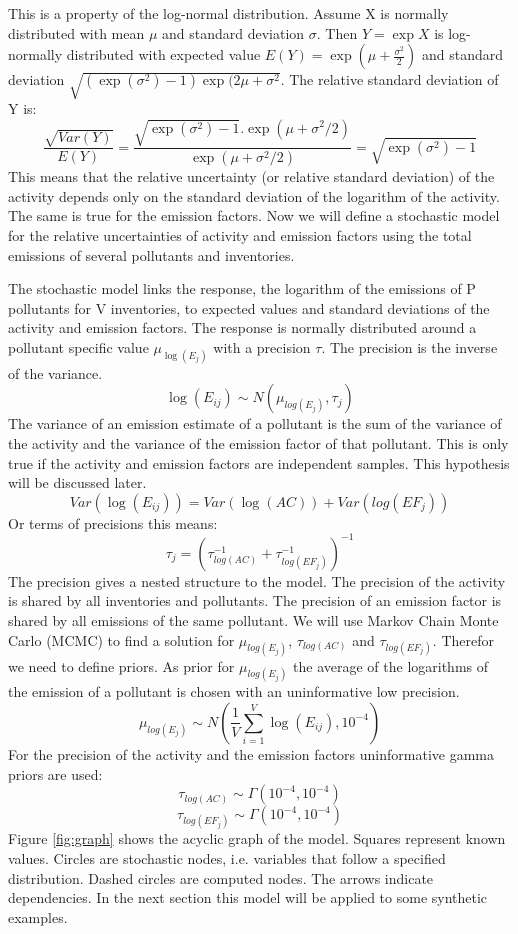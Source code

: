 \documentclass{article}
\begin{document}
This is a property of the log-normal distribution. Assume X is normally distributed with mean \(\mu\) and standard deviation \(\sigma\). Then \(Y=\exp{X}\) is log-normally distributed with expected value \(E(Y)=\exp(\mu+\frac{\sigma^2}{2})\) and standard deviation \(\sqrt{(\exp(\sigma^2)-1)\exp(2\mu+\sigma^2}\). The relative standard deviation of Y is:
\[\frac{\sqrt{Var(Y)}}{E(Y)} = \frac{\sqrt{\exp(\sigma^2)-1}.\exp(\mu+\sigma^2/2)}{\exp(\mu+\sigma^2/2)} = \sqrt{\exp(\sigma^2)-1}\]
This means that the relative uncertainty (or relative standard deviation) of the activity depends only on the standard deviation of the logarithm of the activity. The same is true for the emission factors. Now we will define a stochastic model for the relative uncertainties of activity and emission factors using the total emissions of several pollutants and inventories.

The stochastic model links the response, the logarithm of the emissions of P pollutants for V inventories, to expected values and standard deviations of the activity and emission factors. The response is normally distributed around a pollutant specific value \(\mu_{\log(E_{j})}\) with a precision \(\tau\). The precision is the inverse of the variance.
\[\log(E_{ij}) \sim N(\mu_{log(E_{j})},\tau_{j})\]
The variance of an emission estimate of a pollutant is the sum of the variance of the activity and the variance of the emission factor of that pollutant. This is only true if the activity and emission factors are independent samples. This hypothesis will be discussed later.
\[Var(\log(E_{ij})) = Var(\log(AC)) + Var(log(EF_{j}))\]
Or terms of precisions this means:
\[\tau_{j} = \left(\tau_{log(AC)}^{-1} + \tau_{log(EF_{j})}^{-1}\right)^{-1}\]
The precision gives a nested structure to the model. The precision of the activity is shared by all inventories and pollutants. The precision of an emission factor is shared by all emissions of the same pollutant.
We will use Markov Chain Monte Carlo (MCMC) to find a solution for \(\mu_{log(E_{j})}\), \(\tau_{log(AC)}\) and \(\tau_{log(EF_{j})}\). Therefor we need to define priors. As prior for \(\mu_{log(E_{j})}\) the average of the logarithms of the emission of a pollutant is chosen with an uninformative low precision.
\[\mu_{log(E_{j})} \sim N\left(\frac{1}{V}\sum_{i=1}^{V} \log(E_{ij}),10^{-4}\right) \]
For the precision of the activity and the emission factors uninformative gamma priors are used:
\[\tau_{log(AC)} \sim \Gamma(10^{-4},10^{-4})\]
\[\tau_{log(EF_{j})} \sim \Gamma(10^{-4},10^{-4})\]
Figure \ref{fig:graph} shows the acyclic graph of the model. Squares represent known values. Circles are stochastic nodes, i.e. variables that follow a specified distribution. Dashed circles are computed nodes. The arrows indicate dependencies.
In the next section this model will be applied to some synthetic examples.
\end{document}
